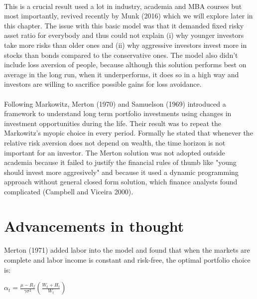 \paragraph{}This is a crucial result used a lot in industry, academia and MBA courses but most importantly, revived recently by Munk (2016) which we will explore later in this chapter. The issue with this basic model was that it demanded fixed risky asset ratio for everybody and thus could not explain (i) why younger investors take more risks than older ones and (ii) why aggressive investors invest more in stocks than bonds compared to the conservative ones. The model also didn't include loss aversion of people, because although this solution performs best on average in the long run, when it underperforms, it does so in a high way and investors are willing to sacrifice possible gains for loss avoidance.

\paragraph{}Following Markowitz, Merton (1970) and Samuelson (1969) introduced a framework to understand long term portfolio investments using changes in investment opportunities during the life. Their result was to repeat the Markowitz's myopic choice in every period. Formally he stated that whenever the relative risk aversion does not depend on wealth, the time horizon is not important for an investor. The Merton solution was not adopted outside academia because it failed to justify the financial rules of thumb like "young should invest more aggresively" and because it used a dynamic programming approach without general closed form solution, which finance analysts found complicated (Campbell and Viceira 2000).



\section{Advancements in thought}

\paragraph*{}Merton (1971) added labor into the model and found that when the markets are complete and labor income is constant and risk-free, the optimal portfolio choice is:

\begin{center}
	$\alpha_t = \frac{\mu - R_f}{\gamma \sigma^2}(\frac{W_t + H_t}{W_t})$
\end{center}

